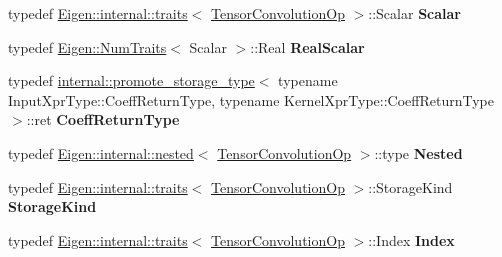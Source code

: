 \begin{DoxyCompactItemize}
\item 
\mbox{\label{class_eigen_1_1_tensor_convolution_op_a27d002a13325d32a55eceee039ec73dc}} 
typedef \hyperlink{struct_eigen_1_1internal_1_1traits}{Eigen\+::internal\+::traits}$<$ \hyperlink{class_eigen_1_1_tensor_convolution_op}{Tensor\+Convolution\+Op} $>$\+::Scalar {\bfseries Scalar}
\item 
\mbox{\label{class_eigen_1_1_tensor_convolution_op_a9514f129b39caff0315cdcebb4ae847c}} 
typedef \hyperlink{group___core___module_struct_eigen_1_1_num_traits}{Eigen\+::\+Num\+Traits}$<$ Scalar $>$\+::Real {\bfseries Real\+Scalar}
\item 
\mbox{\label{class_eigen_1_1_tensor_convolution_op_a6dfdaa2cd15b992e16d1c633abd1f075}} 
typedef \hyperlink{struct_eigen_1_1internal_1_1promote__storage__type}{internal\+::promote\+\_\+storage\+\_\+type}$<$ typename Input\+Xpr\+Type\+::\+Coeff\+Return\+Type, typename Kernel\+Xpr\+Type\+::\+Coeff\+Return\+Type $>$\+::ret {\bfseries Coeff\+Return\+Type}
\item 
\mbox{\label{class_eigen_1_1_tensor_convolution_op_a827fd3d828f9da2138d313db48608473}} 
typedef \hyperlink{struct_eigen_1_1internal_1_1nested}{Eigen\+::internal\+::nested}$<$ \hyperlink{class_eigen_1_1_tensor_convolution_op}{Tensor\+Convolution\+Op} $>$\+::type {\bfseries Nested}
\item 
\mbox{\label{class_eigen_1_1_tensor_convolution_op_a3a4c61d4b411df393efdd3c65e9f0f61}} 
typedef \hyperlink{struct_eigen_1_1internal_1_1traits}{Eigen\+::internal\+::traits}$<$ \hyperlink{class_eigen_1_1_tensor_convolution_op}{Tensor\+Convolution\+Op} $>$\+::Storage\+Kind {\bfseries Storage\+Kind}
\item 
\mbox{\label{class_eigen_1_1_tensor_convolution_op_a1b7f2ba89d147722e7e6f37d6bc2eab7}} 
typedef \hyperlink{struct_eigen_1_1internal_1_1traits}{Eigen\+::internal\+::traits}$<$ \hyperlink{class_eigen_1_1_tensor_convolution_op}{Tensor\+Convolution\+Op} $>$\+::Index {\bfseries Index}
\end{DoxyCompactItemize}
